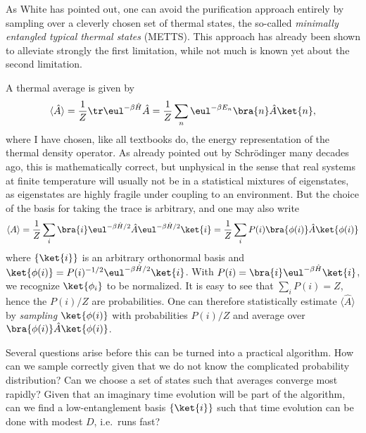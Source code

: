 As White \cite{Stoudenmire10,White09} has pointed out, one can avoid the purification approach entirely by sampling over a cleverly chosen set of thermal states, the so-called {\em minimally entangled typical thermal states} (METTS). This approach has already been shown to alleviate strongly the first limitation, while not much is known yet about the second limitation. 

A thermal average is given by
\begin{equation}
\langle \hat{A} \rangle = \frac{1}{Z} \tr \eul^{-\beta \hat{H}} \hat{A} = \frac{1}{Z} \sum_n \eul^{-\beta E_n} \bra{n} \hat{A} \ket{n} ,
\end{equation}
where I have chosen, like all textbooks do, the energy representation of the thermal density operator. As already pointed out by Schr\"{o}dinger many decades ago, this is mathematically correct, but unphysical in the sense that real systems at finite temperature will usually not be in a statistical mixtures of eigenstates, as eigenstates are highly fragile under coupling to an environment. But the choice of the basis for taking the trace is arbitrary, and one may also write
\begin{equation}
\langle A \rangle = \frac{1}{Z} \sum_i \bra{i} \eul^{-\beta\hat{H}/2} \hat{A} \eul^{-\beta\hat{H}/2} \ket{i}
= \frac{1}{Z} \sum_i P(i) \bra{\phi(i)} \hat{A} \ket{\phi(i)}
\end{equation}
where $\{ \ket{i} \}$ is an arbitrary orthonormal basis and $\ket{\phi(i)} = P(i)^{-1/2} \eul^{-\beta\hat{H}/2} \ket{i}$. With $P(i) = \bra{i} \eul^{-\beta \hat{H}} \ket{i}$, we recognize $\ket{\phi_{i}}$ to be normalized. It is easy to see that $\sum_i P(i) = Z$, hence the $P(i)/Z$ are probabilities. One can therefore statistically estimate $\langle \hat{A}\rangle$ by {\em sampling} $\ket{\phi(i)}$ with probabilities $P(i)/Z$ and average over $\bra{\phi(i)} \hat{A} \ket{\phi(i)}$.

Several questions arise before this can be turned into a practical algorithm. How can we sample correctly given that we do not know the complicated probability distribution? Can we choose a set of states such that averages converge most rapidly? Given that an imaginary time evolution will be part of the algorithm, can we find a low-entanglement basis $\{ \ket{i} \}$ such that time evolution can be done with modest $D$, i.e.\ runs fast?

